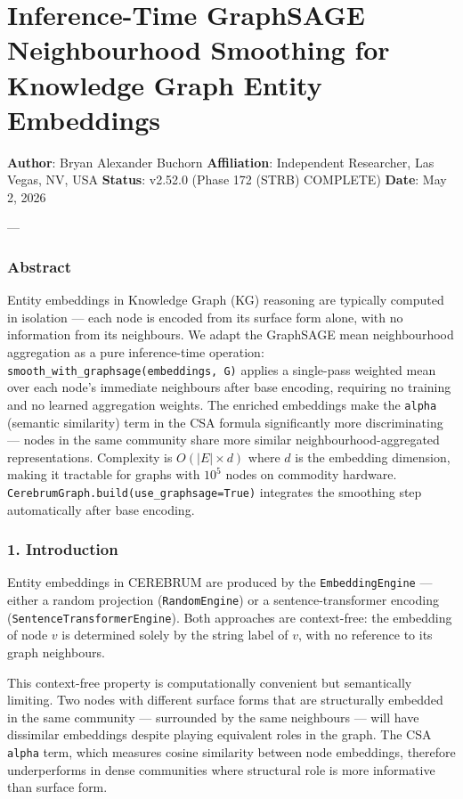 \section{Inference-Time GraphSAGE Neighb\-ourhood Smoothing for Knowledge Graph Entity Embeddings}

\textbf{Author}: Bryan Alexander Buchorn  
\textbf{Affiliation}: Independent Researcher, Las Vegas, NV, USA  
\textbf{Status}: v2.52.0 (Phase 172 (STRB) COMPLETE)
\textbf{Date}: May 2, 2026

---

\subsubsection{Abstract}
Entity embeddings in Knowledge Graph (KG) reasoning are typically computed in isolation — each node is encoded from its surface form alone, with no information from its neighbours. We adapt the GraphSAGE \cite{hamilton2017graphsage} mean neigh\-bourhood aggregation as a pure inference-time operation: \texttt{smooth\_with\_graphsage(embeddings, G)} applies a single-pass weighted mean over each node's immediate neighbours after base encoding, requiring no training and no learned aggregation weights. The enriched embeddings make the \texttt{alpha} (semantic similarity) term in the CSA formula \cite{vaswani2017attention} signi\-ficantly more discr\-iminating — nodes in the same community share more similar neigh\-bourhood-aggregated repre\-sentations. Complexity is $O(|E| \times d)$ where $d$ is the embedding dimension, making it tractable for graphs with $10^5$ nodes on commodity hardware. \texttt{CerebrumGraph.build(use\_graphsage=True)} integrates the smoothing step autom\-atically after base encoding.

\subsubsection{1. Introd\-uction}
Entity embeddings in CEREBRUM are produced by the \texttt{EmbeddingEngine} — either a random projection (\texttt{RandomEngine}) or a sentence-transformer encoding (\texttt{SentenceTransformerEngine}). Both approaches are context-free: the embedding of node $v$ is determined solely by the string label of $v$, with no reference to its graph neighbours.

This context-free property is compu\-tationally convenient but seman\-tically limiting. Two nodes with different surface forms that are struc\-turally embedded in the same community — surrounded by the same neighbours — will have dissimilar embeddings despite playing equivalent roles in the graph. The CSA \texttt{alpha} term, which measures cosine similarity between node embeddings, therefore under\-performs in dense communities where structural role is more informative than surface form.

